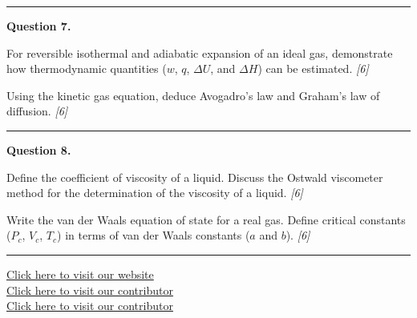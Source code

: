 \documentclass[11pt,a4paper]{article}
\newcommand{\pts}[1]{\hfill   \textit{[#1]}}
\begin{document}
\medskip\rule{\linewidth}{0.2pt}




\noindent   \textbf{Question 7.}

\begin{parts}
  \item For reversible isothermal and adiabatic expansion of an ideal gas, demonstrate how thermodynamic quantities ($w$, $q$, $\Delta U$, and $\Delta H$) can be estimated. \pts{6}
  \item Using the kinetic gas equation, deduce Avogadro's law and Graham's law of diffusion. \pts{6}
\end{parts}

\medskip\rule{\linewidth}{0.2pt}




\noindent   \textbf{Question 8.}

\begin{parts}
  \item Define the coefficient of viscosity of a liquid. Discuss the Ostwald viscometer method for the determination of the viscosity of a liquid. \pts{6}
  \item Write the van der Waals equation of state for a real gas. Define critical constants ($P_c$, $V_c$, $T_c$) in terms of van der Waals constants ($a$ and $b$). \pts{6}
\end{parts}

\vfill
\rule{\linewidth}{0.4pt}

\begin{center}\small
  \href{https://bhu-exam.vercel.app/}{Click here to visit our website}\\[4pt]
  \href{https://me-aryan.vercel.app/}{Click here to visit our contributor}\\[4pt]
  \href{https://quashan-me.vercel.app/}{Click here to visit our contributor}
\end{center}
\end{document}
